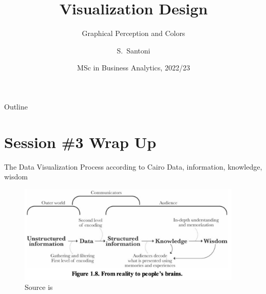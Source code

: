 \documentclass[notes, aspectratio=1610]{beamer}
\title[Visualization Design]%
{Visualization Design}
\subtitle{Graphical Perception and Colors}
\author{S.~Santoni\inst{1}\inst{2}}
\institute{
	\inst{1}%
	Bayes Business School
	\and
	\inst{2}%
	Soundcloud
	}
\date{MSc in Business Analytics, 2022/23}
\begin{document}
\begin{frame}
	\titlepage
\end{frame}

\begin{frame}{Outline}
	\tableofcontents
\end{frame}

\section{Session \#3 Wrap Up}

\begin{frame}{The Data Visualization Process according to Cairo}
	{Data, information, knowledge, wisdom}{}
	\begin{figure}
		\includegraphics[width=0.95\textwidth]{images/cairo_model.png}
		\caption*{Source is \cite[][page 29]{cairo2012}}
	\end{figure}
\end{frame}
\end{document}
